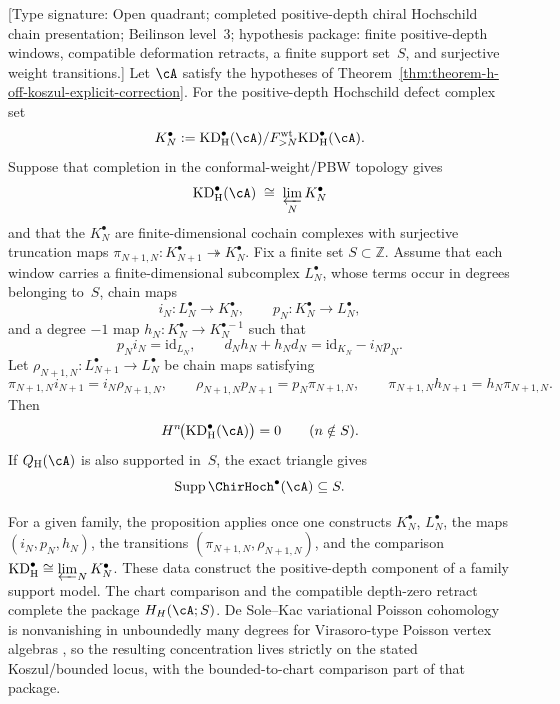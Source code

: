 \begin{proposition}
\label{prop:theorem-h-finite-window-kdh-retracts}
\textup{[Type signature: Open quadrant; completed positive-depth
chiral Hochschild chain presentation; Beilinson level~$3$; hypothesis
package: finite positive-depth windows, compatible deformation
retracts, a finite support set~$S$, and surjective weight
transitions.]}
Let $\cA$ satisfy the hypotheses of
Theorem~\ref{thm:theorem-h-off-koszul-explicit-correction}.  For the
positive-depth Hochschild defect complex set
\[
 K_N^\bullet
 :=\mathrm{KD}_{\mathrm H}^{\bullet}(\cA)/
 F_{>N}^{\mathrm{wt}}\mathrm{KD}_{\mathrm H}^{\bullet}(\cA).
\]
Suppose that completion in the conformal-weight/PBW topology gives
\[
 \mathrm{KD}_{\mathrm H}^{\bullet}(\cA)
 \;\cong\;
 \varprojlim_N K_N^\bullet
\]
and that the $K_N^\bullet$ are finite-dimensional cochain complexes
with surjective truncation maps
\(\pi_{N+1,N}\colon K_{N+1}^\bullet\twoheadrightarrow K_N^\bullet\).
Fix a finite set $S\subset\mathbb Z$.  Assume that each window
carries a finite-dimensional subcomplex \(L_N^\bullet\), whose terms
occur in degrees belonging to~$S$, chain maps
\[
 i_N\colon L_N^\bullet\longrightarrow K_N^\bullet,
 \qquad
 p_N\colon K_N^\bullet\longrightarrow L_N^\bullet,
\]
and a degree \(-1\) map
\(h_N\colon K_N^\bullet\to K_N^{\bullet-1}\) such that
\[
 p_Ni_N=\mathrm{id}_{L_N},\qquad
 d_Nh_N+h_Nd_N=\mathrm{id}_{K_N}-i_Np_N.
\]
Let
\(\rho_{N+1,N}\colon L_{N+1}^\bullet\to L_N^\bullet\)
be chain maps satisfying
\[
 \pi_{N+1,N}i_{N+1}=i_N\rho_{N+1,N},\qquad
 \rho_{N+1,N}p_{N+1}=p_N\pi_{N+1,N},\qquad
 \pi_{N+1,N}h_{N+1}=h_N\pi_{N+1,N}.
\]
Then
\[
 H^n\!\bigl(\mathrm{KD}_{\mathrm H}^{\bullet}(\cA)\bigr)=0
 \qquad(n\notin S).
\]
If $Q_{\mathrm H}(\cA)$ is also supported in~$S$, the exact triangle
gives
\[
 \operatorname{Supp}\ChirHoch^\bullet(\cA)\subseteq S.
\]

For a given family, the proposition applies once one constructs
\(K_N^\bullet\), \(L_N^\bullet\), the maps
\((i_N,p_N,h_N)\), the transitions
\((\pi_{N+1,N},\rho_{N+1,N})\), and the comparison
\(\mathrm{KD}_{\mathrm H}^{\bullet}\cong\varprojlim_N K_N^\bullet\).
These data construct the positive-depth component of a family support
model.  The chart comparison and the compatible depth-zero retract
complete the package $H_H(\cA;S)$.  De Sole--Kac variational Poisson
cohomology is nonvanishing in unboundedly many degrees for
Virasoro-type Poisson vertex algebras \cite{BDSK21}, so the resulting
concentration lives strictly on the stated Koszul/bounded locus, with
the bounded-to-chart comparison part of that package.
\end{proposition}

